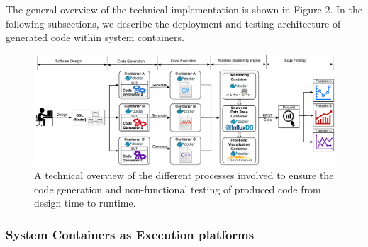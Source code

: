 The general overview of the technical implementation is shown in Figure 2. In the following subsections, we describe the deployment and testing architecture of generated code within system containers.


\begin{figure}[!h]
	\includegraphics[width=1\linewidth]{Ressources/background2.pdf}
	\caption{A technical overview of the different processes involved to ensure the code generation and non-functional testing of produced code from design time to runtime.}
\end{figure}


\subsubsection{System Containers as Execution platforms}





